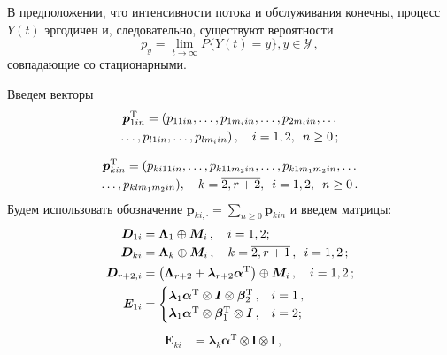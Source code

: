 \begin{multicols}{2}
В предположении, что интенсивности потока и обслуживания конечны, процесс~$Y(t)$ эргодичен и, 
следовательно, существуют вероятности
\begin{equation*}
p_y=\lim\limits_{t\rightarrow\infty}P\{Y(t)=y\}, y\in \mathcal{Y}\,,
\end{equation*}
совпадающие со стационарными.

Введем векторы
\begin{multline*}
\boldsymbol{p}_{1in}^{\mathrm{T}}=
(p_{11in},\ldots,p_{1m_iin},\ldots , p_{2m_iin},\ldots\\
\ldots , p_{l1in},\ldots, p_{lm_iin})\,,\quad  i=1,2,\enskip n\geq 0\,;
\end{multline*}

\vspace*{-14pt}

\noindent
\begin{multline*}
\boldsymbol{p}_{kin}^{\mathrm{T}}=(p_{ki11in},\ldots,p_{k11m_2in},\ldots,p_{k1m_1m_2in},
\ldots\\
\ldots,
p_{klm_1m_2in}),\quad k=\overline{2,r+2},\enskip i=1,2, \enskip n\geq 0\,.
\end{multline*}
Будем использовать обозначение $\boldsymbol{p}_{ki,\cdot}=\sum\limits_{n\geq 0} \boldsymbol{p}_{kin}$ и введем матрицы:
\begin{align*}
\boldsymbol{D}_{1i}&=\boldsymbol{\Lambda}_1\oplus \boldsymbol{M}_i\,,\quad i=1,2;\\
\boldsymbol{D}_{ki}&=\boldsymbol{\Lambda}_k\oplus \boldsymbol{M}_i\,,\quad k=\overline{2,r+1}\,,\enskip i=1,2\,;\\
\boldsymbol{D}_{r+2,i}&=\left(\boldsymbol{\Lambda}_{r+2}+ \boldsymbol{\lambda}_{r+2}\boldsymbol{\alpha}^{\mathrm{T}}\right)\oplus \boldsymbol{M}_i\,,\quad i=1,2\,;\\
\boldsymbol{E}_{1i}&=
\begin{cases}
\boldsymbol{\lambda}_1\boldsymbol{\alpha}^{\mathrm{T}}\otimes\boldsymbol{I}\otimes
\boldsymbol{\beta}_2^{\mathrm{T}}\,, & i=1\,,\\
\boldsymbol{\lambda}_1\boldsymbol{\alpha}^{\mathrm{T}}\otimes
\boldsymbol{\beta}_1^{\mathrm{T}}  \otimes\boldsymbol{I}\,, & i=2;
\end{cases}
\end{align*}
\begin{align*}
\boldsymbol{E}_{ki}&=\boldsymbol{\lambda}_k\boldsymbol{\alpha}^{\mathrm{T}} \otimes\boldsymbol{I}\otimes\boldsymbol{I}\,,\quad

\end{align*}
\end{multicols}
